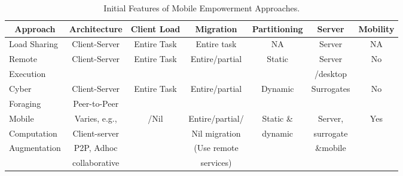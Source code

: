 \documentclass[publish]{IEEEtran}
\begin{document}
\begin{table*}[t] 
\caption{Initial Features of Mobile Empowerment Approaches.} \label{approaches}
  \centering
    \begin{tabular}{|l|c|c|c|c|c|c|} 
    \hline
    \multicolumn{1}{|c|}{Approach} & \multicolumn{1}{c|}{Architecture} & \multicolumn{1}{c|}{Client Load} & \multicolumn{1}{c|}{Migration} & \multicolumn{1}{c|}{Partitioning} & \multicolumn{1}{c|}{Server} & \multicolumn{1}{c|}{Mobility}\bigstrut\\
    \hline
Load Sharing & \multicolumn{1}{c|}{Client-Server} & \multicolumn{1}{c|}{Entire Task} & \multicolumn{1}{c|}{Entire task} & \multicolumn{1}{c|}{NA} & \multicolumn{1}{c|}{Server} & \multicolumn{1}{c|}{NA}\bigstrut\\
    \hline
Remote  & \multicolumn{1}{c|}{\multirow{2}[2]{*}{Client-Server}} & \multicolumn{1}{c|}{\multirow{2}[2]{*}{Entire Task}} & \multicolumn{1}{c|}{\multirow{2}[2]{*}{Entire/partial}} & \multicolumn{1}{c|}{\multirow{2}[2]{*}{Static}} & \multicolumn{1}{c|}{Server} & \multicolumn{1}{c|}{No}\bigstrut[t]\\
Execution & \multicolumn{1}{c|}{} & \multicolumn{1}{c|}{} & \multicolumn{1}{c|}{} & \multicolumn{1}{c|}{} & \multicolumn{1}{c|}{/desktop} & \multicolumn{1}{c|}{}\bigstrut[b]\\
    \hline
   Cyber & \multicolumn{1}{c|}{Client-Server} & \multicolumn{1}{c|}{\multirow{2}[2]{*}{Entire Task}} & \multicolumn{1}{c|}{\multirow{2}[2]{*}{Entire/partial}} & \multicolumn{1}{c|}{\multirow{2}[2]{*}{Dynamic}} & \multicolumn{1}{c|}{Surrogates} & \multicolumn{1}{c|}{No}\bigstrut[t]\\
Foraging& \multicolumn{1}{c|}{Peer-to-Peer} & \multicolumn{1}{c|}{} & \multicolumn{1}{c|}{} & \multicolumn{1}{c|}{} & \multicolumn{1}{c|}{} & \multicolumn{1}{c|}{}\bigstrut[b]\\
    \hline
   Mobile & \multicolumn{1}{c|}{Varies, e.g.,} & \multicolumn{1}{c|}{\multirow{5}[2]{*}{/Nil}} & Entire/partial/ & \multicolumn{1}{c|}{Static \&} & \multicolumn{1}{c|}{Server,} & \multicolumn{1}{c|}{Yes}\bigstrut[t]\\
    Computation  & \multicolumn{1}{c|}{Client-server}& \multicolumn{1}{c|}{Entire/partial} & Nil migration & \multicolumn{1}{c|}{dynamic} & \multicolumn{1}{c|}{surrogate}& \multicolumn{1}{c|}{} \\
    Augmentation & \multicolumn{1}{c|}{P2P, Adhoc} & \multicolumn{1}{c|}{} &(Use remote&    & \multicolumn{1}{c|}{\&mobile} & \multicolumn{1}{c|}{} \\
       & \multicolumn{1}{c|}{collaborative} & \multicolumn{1}{c|}{} & services) &    &  & \multicolumn{1}{c|}{}\\ \hline
    \end{tabular}\end{table*}
\end{document}
